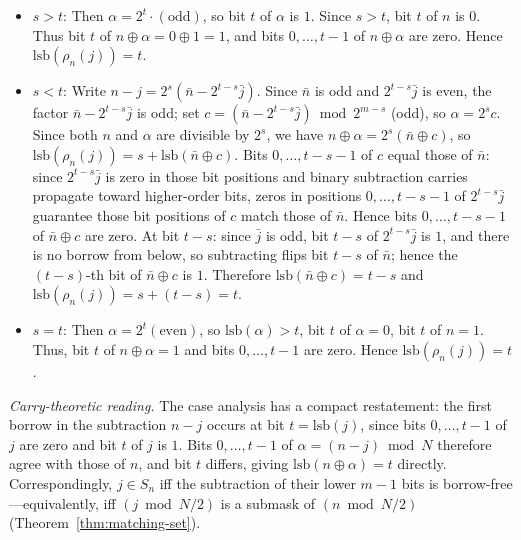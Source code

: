 \documentclass[11pt]{article}
\begin{document}
\begin{itemize}
\item $s > t$: Then $\alpha = 2^t \cdot (\text{odd})$, so bit $t$ of $\alpha$ is $1$. Since $s > t$, bit $t$ of $n$ is $0$. Thus bit $t$ of $n\oplus \alpha = 0\oplus 1 = 1$, and bits $0,\ldots,t-1$ of $n\oplus \alpha$ are zero. Hence $\mathrm{lsb}(\rho_n(j)) = t$.

\item $s < t$: Write $n - j = 2^s(\bar{n} - 2^{t-s}\bar{j})$. Since $\bar{n}$ is odd and $2^{t-s}\bar{j}$ is even, the factor $\bar{n} - 2^{t-s}\bar{j}$ is odd; set $c = (\bar{n} - 2^{t-s}\bar{j})\bmod 2^{m-s}$ (odd), so $\alpha = 2^s c$. Since both $n$ and $\alpha$ are divisible by $2^s$, we have $n\oplus \alpha = 2^s(\bar{n}\oplus c)$, so $\mathrm{lsb}(\rho_n(j)) = s + \mathrm{lsb}(\bar{n}\oplus c)$. Bits $0,\ldots,t-s-1$ of $c$ equal those of $\bar{n}$: since $2^{t-s}\bar{j}$ is zero in those bit positions and binary subtraction carries propagate toward higher-order bits, zeros in positions $0,\ldots,t-s-1$ of $2^{t-s}\bar{j}$ guarantee those bit positions of $c$ match those of $\bar{n}$. Hence bits $0,\ldots,t-s-1$ of $\bar{n}\oplus c$ are zero. At bit $t-s$: since $\bar{j}$ is odd, bit $t-s$ of $2^{t-s}\bar{j}$ is $1$, and there is no borrow from below, so subtracting flips bit $t-s$ of $\bar{n}$; hence the $(t-s)$-th bit of $\bar{n}\oplus c$ is $1$. Therefore $\mathrm{lsb}(\bar{n}\oplus c) = t-s$ and $\mathrm{lsb}(\rho_n(j)) = s+(t-s) = t$.

\item $s = t$: Then $\alpha = 2^t(\text{even})$, so $\mathrm{lsb}(\alpha) > t$, bit $t$ of $\alpha = 0$, bit $t$ of $n = 1$. Thus, bit $t$ of $n\oplus \alpha = 1$ and bits $0,\ldots,t-1$ are zero. Hence $\mathrm{lsb}(\rho_n(j)) = t$.
\end{itemize}

\smallskip
\emph{Carry-theoretic reading.} The case analysis has a compact restatement: the first borrow in the subtraction $n-j$ occurs at bit $t=\mathrm{lsb}(j)$, since bits $0,\ldots,t-1$ of $j$ are zero and bit $t$ of $j$ is $1$. Bits $0,\ldots,t-1$ of $\alpha=(n-j)\bmod N$ therefore agree with those of $n$, and bit $t$ differs, giving $\mathrm{lsb}(n\oplus \alpha)=t$ directly. Correspondingly, $j\in S_n$ iff the subtraction of their lower $m-1$ bits is borrow-free---equivalently, iff $(j\bmod N/2)$ is a submask of $(n\bmod N/2)$ (Theorem~\ref{thm:matching-set}).
\end{document}
